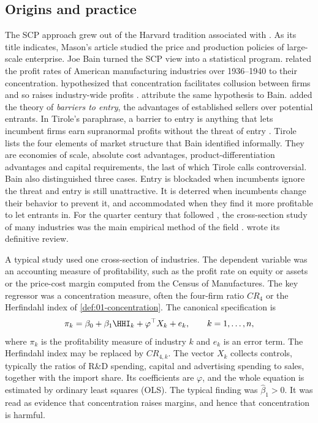 \subsection{Origins and practice}\label{sec:01-scp-practice}

The SCP approach grew out of the Harvard tradition associated with \citet{Mason1939}. As its title indicates,
Mason's article studied the price and production policies of large-scale enterprise.
Joe Bain turned the SCP view into a statistical program. \citet{Bain1951} related
the profit rates of American manufacturing industries over 1936--1940 to their concentration.
\citet{Bain1951,Bain1956} hypothesized that concentration facilitates collusion between firms and so raises
industry-wide profits \citep[Section~5.5]{Tirole1988}. \citet[p.~46]{LevensteinSuslow2006} attribute the same
hypothesis to Bain. \citet{Bain1956} added the theory of \emph{barriers to entry}, the advantages of established
sellers over potential entrants. In Tirole's paraphrase, a barrier to entry is anything that lets incumbent firms
earn supranormal profits without the threat of entry \citep[Chapter~8, introduction]{Tirole1988}. Tirole lists
the four elements of market structure that Bain identified informally. They are economies of scale, absolute cost
advantages, product-differentiation advantages and capital requirements, the last of which Tirole calls
controversial. Bain also distinguished three cases. Entry is blockaded when incumbents ignore the threat and entry
is still unattractive. It is deterred when incumbents change their behavior to prevent it, and accommodated when
they find it more profitable to let entrants in. For the quarter century that followed \citet{Bain1951}, the
cross-section study of many industries was the main empirical method of the field \citep[p.~1012]{Bresnahan1989}.
\citet{Schmalensee1989} wrote its definitive review.

A typical study used one cross-section of industries. The dependent variable was an accounting measure
of profitability, such as the profit rate on equity or assets or the price-cost margin computed from the
Census of Manufactures. The key regressor was a concentration measure, often the four-firm ratio
$\mathit{CR}_4$ or the Herfindahl index of \cref{def:01-concentration}. The canonical specification is
\begin{equation}\label{eq:01-scp-regression}
\pi_k = \beta_0 + \beta_1 \HHI_k + \varphi^\top X_k + e_k, \qquad k = 1, \dots, n,
\end{equation}
where $\pi_k$ is the profitability measure of industry $k$ and $e_k$ is an error term. The Herfindahl
index may be replaced by $\mathit{CR}_{4,k}$. The vector $X_k$ collects controls, typically the ratios of
R\&D spending, capital and advertising spending to sales, together with the import share. Its
coefficients are $\varphi$, and the whole equation is estimated by ordinary least squares (OLS). The typical finding was
$\hat\beta_1 > 0$. It was read as evidence that concentration raises margins, and hence that
concentration is harmful.

